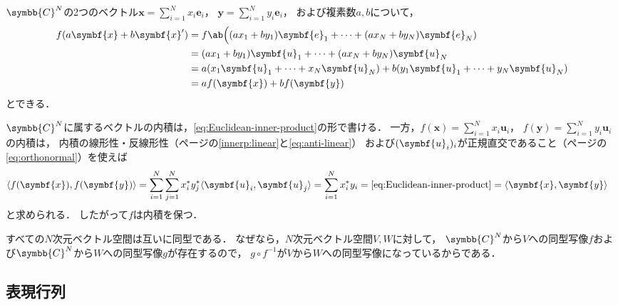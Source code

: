 \documentclass[
]{sotsu}
\begin{document}
\quad 
$\symbb{C}^N$の2つのベクトル$\symbf{x} = \sum_{i = 1}^{N} x_i \symbf{e}_i$，
$\symbf{y} = \sum_{i = 1}^{N} y_i \symbf{e}_i$，
および複素数$a, b$について，
\begin{equation*}
    \begin{split}
        f(a \symbf{x} + b \symbf{x}')
            &= f \ab\Big(
                    (a x_1 + b y_1) \symbf{e}_1
                    + \dots + 
                    (a x_N + b y_N) \symbf{e}_N
                )
            \\
            &= (a x_1 + b y_1) \symbf{u}_1
                + \dots + 
                (a x_N + b y_N) \symbf{u}_N
            \\
            &= a (x_1 \symbf{u}_1 + \dots + x_N \symbf{u}_N)
             + b (y_1 \symbf{u}_1 + \dots + y_N \symbf{u}_N)
            \\
            &= a f(\symbf{x}) + b f(\symbf{y})
    \end{split}
\end{equation*}
とできる．


\quad
$\symbb{C}^N$に属するベクトルの内積は，\cref{eq:Euclidean-inner-product}の形で書ける．
一方，$f(\symbf{x}) = \sum_{i = 1}^{N} x_i \symbf{u}_i$，
$f(\symbf{y}) = \sum_{i = 1}^{N} y_i \symbf{u}_i$の内積は，
内積の線形性・反線形性（\pageref{innerp:linear}ページの\cref{innerp:linear}と\cref{eq:anti-linear}）
および$\sequ{\symbf{u}_i}[i]$が正規直交であること（\pageref{eq:orthonormal}ページの\cref{eq:orthonormal}）を使えば
\begin{equation*}
    \begin{split}
        \iparen{ f(\symbf{x}), f(\symbf{y}) }
        &= \sum_{i = 1}^{N} \sum_{j = 1}^{N}
            \conj{x_i} \conj{y_j}
            \iparen{\symbf{u}_i, \symbf{u}_j}
        = \sum_{i = 1}^{N} \conj{x_i} y_i
        = \text{\cref{eq:Euclidean-inner-product}}
        = \iparen{\symbf{x}, \symbf{y}}
    \end{split}
\end{equation*}
と求められる．
したがって$f$は内積を保つ．


すべての$N$次元ベクトル空間は互いに同型である．
なぜなら，$N$次元ベクトル空間$V, W$に対して，
$\symbb{C}^N$から$V$への同型写像$f$および$\symbb{C}^N$から$W$への同型写像$g$が存在するので，
$g \circ f^{-1}$が$V$から$W$への同型写像になっているからである．



\subsection{表現行列}
\end{document}
